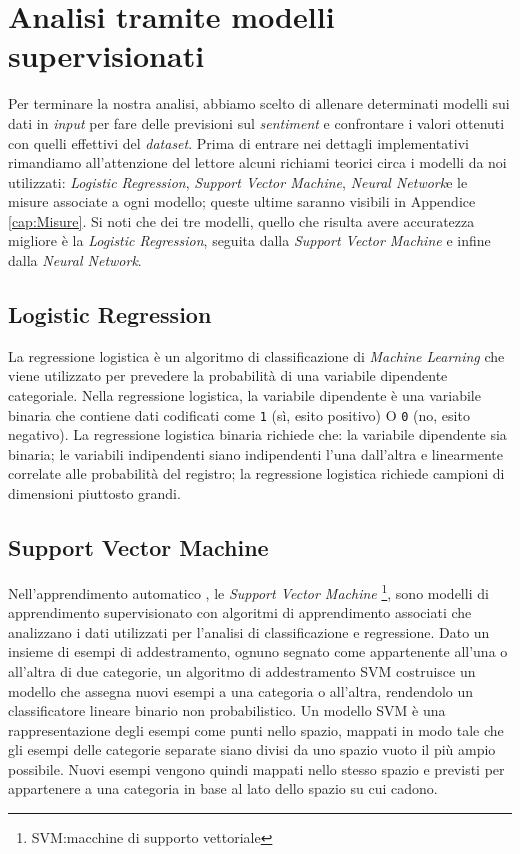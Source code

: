\chapter{Analisi tramite modelli supervisionati}
		Per terminare la nostra analisi, abbiamo scelto di allenare determinati modelli sui dati in \textit{input} per fare delle previsioni sul \textit{sentiment} e confrontare i valori ottenuti con quelli effettivi del \textit{dataset}. Prima di entrare nei dettagli implementativi rimandiamo all'attenzione del lettore alcuni richiami teorici circa i modelli da noi utilizzati: \textit{Logistic Regression}, \textit{Support Vector Machine}, \textit{Neural Network}e le misure associate a ogni modello; queste ultime saranno visibili in Appendice \ref{cap:Misure}. Si noti che dei tre modelli, quello che risulta avere accuratezza migliore è la \textit{Logistic Regression}, seguita dalla \textit{Support Vector Machine} e  infine dalla \textit{Neural Network}. 
		
			
		\section{Logistic Regression}
			La regressione logistica è un algoritmo di classificazione di \textit{Machine Learning} che viene utilizzato per prevedere la probabilità di una variabile dipendente categoriale. Nella regressione logistica, la variabile dipendente è una variabile binaria che contiene dati codificati come \verb|1| (sì, esito positivo) O \verb|0| (no, esito negativo). La regressione logistica binaria richiede che: la variabile dipendente sia binaria; le variabili indipendenti siano indipendenti l'una dall'altra e linearmente correlate alle probabilità del registro; la regressione logistica richiede campioni di dimensioni piuttosto grandi.
			
			

		\section{Support Vector Machine}
			Nell'apprendimento automatico , le \textit{Support Vector Machine} \footnote{SVM:macchine di supporto vettoriale}, sono modelli di apprendimento supervisionato con algoritmi di apprendimento associati che analizzano i dati utilizzati per l'analisi di classificazione e regressione. Dato un insieme di esempi di addestramento, ognuno segnato come appartenente all'una o all'altra di due categorie, un algoritmo di addestramento SVM costruisce un modello che assegna nuovi esempi a una categoria o all'altra, rendendolo un classificatore lineare binario non probabilistico. Un modello SVM è una rappresentazione degli esempi come punti nello spazio, mappati in modo tale che gli esempi delle categorie separate siano divisi da uno spazio vuoto il più ampio possibile. Nuovi esempi vengono quindi mappati nello stesso spazio e previsti per appartenere a una categoria in base al lato dello spazio su cui cadono.
		
